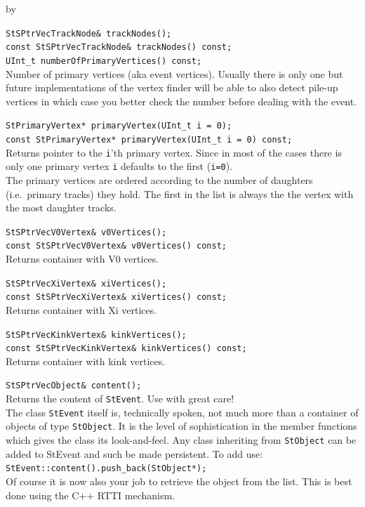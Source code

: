\documentclass[twoside]{article}
\newcommand{\entrylabel}[1]{\mbox{\textbf{{#1}}}\hfil}%
\newenvironment{entry}
{\begin{list}{}%
    {\renewcommand{\makelabel}{\entrylabel}%
     \setlength{\labelwidth}{90pt}%
     \setlength{\leftmargin}{\labelwidth}
     \advance\leftmargin by \labelsep%
      }%
    }%
  {\end{list}}
\newcommand{\Entrylabel}[1]%
{\raisebox{0pt}[1ex][0pt]{\makebox[\labelwidth][l]%
    {\parbox[t]{\labelwidth}{\hspace{0pt}\textbf{{#1}}}}}}
\newenvironment{Entry}%
{\renewcommand{\entrylabel}{\Entrylabel}\begin{entry}}%
  {\end{entry}}
\begin{document}
\begin{Entry}
    \verb+StSPtrVecTrackNode& trackNodes();+\\
    \verb+const StSPtrVecTrackNode& trackNodes() const;+\\
    
    \verb+UInt_t numberOfPrimaryVertices() const;+\\
    Number of primary vertices (aka event vertices).  Usually there is
    only one but future implementations of the vertex finder will be
    able to also detect pile-up vertices in which case you better
    check the number before dealing with the event.
    
    \verb+StPrimaryVertex* primaryVertex(UInt_t i = 0);+\\
    \verb+const StPrimaryVertex* primaryVertex(UInt_t i = 0) const;+\\
    Returns pointer to the \texttt{i}'th primary vertex.  Since in
    most of the cases there is only one primary vertex \texttt{i}
    defaults to the first (\texttt{i=0}).\\
    The primary vertices are ordered according to the number of daughters
    (i.e.~primary tracks) they hold. The first in the list is always the
    the vertex with the most daughter tracks.
    
    \verb+StSPtrVecV0Vertex& v0Vertices();+\\
    \verb+const StSPtrVecV0Vertex& v0Vertices() const;+\\
    Returns container with V0 vertices.
    
    \verb+StSPtrVecXiVertex& xiVertices();+\\
    \verb+const StSPtrVecXiVertex& xiVertices() const;+\\
    Returns container with Xi vertices.
    
    \verb+StSPtrVecKinkVertex& kinkVertices();+\\
    \verb+const StSPtrVecKinkVertex& kinkVertices() const;+\\
    Returns container with kink vertices.

    \verb+StSPtrVecObject& content();+\\
    Returns the content of \texttt{StEvent}. Use with great care!\\
    The class \texttt{StEvent} itself is, technically spoken, not
    much more than a container of objects of type \texttt{StObject}.
    It is the level of sophistication in the member functions
    which gives the class its look-and-feel. Any class inheriting
    from \texttt{StObject} can be added to StEvent and such be made
    persistent. To add use:\\
    \texttt{StEvent::content().push\_back(StObject*);}\\
    Of course it is now also your job to retrieve the object from the
    list. This is best done using the C++ RTTI mechanism.
    

\end{Entry}
\end{document}
